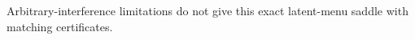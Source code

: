 Arbitrary-interference limitations do not give this exact latent-menu saddle with matching certificates.